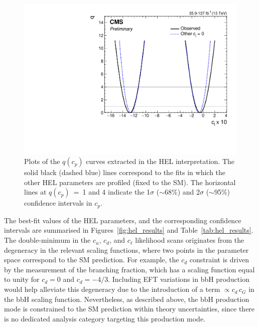 \begin{figure}[htbp]
  \includegraphics[width=.42\linewidth]{Figures/eft/cl_likelihood.pdf}
  \caption[Likelihood scans of the HEL parameters]
  {
    Plots of the $q(c_p)$ curves extracted in the HEL interpretation. The solid black (dashed blue) lines correspond to the fits in which the other HEL parameters are profiled (fixed to the SM). The horizontal lines at $q(c_p)$~=~1 and 4 indicate the 1$\sigma$ ($\sim$68\%) and 2$\sigma$ ($\sim$95\%) confidence intervals in $c_p$.
  }
  \label{fig:hel_likelihood_scans}
\end{figure}

The best-fit values of the HEL parameters, and the corresponding confidence intervals are summarised in Figures~\ref{fig:hel_results} and Table~\ref{tab:hel_results}. The double-minimum in the $c_u$, $c_d$, and $c_\ell$ likelihood scans originates from the degeneracy in the relevant scaling functions, where two points in the parameter space correspond to the SM prediction. For example, the $c_d$ constraint is driven by the measurement of the \Hbb branching fraction, which has a scaling function equal to unity for $c_d=0$ and $c_d=-4/3$. Including EFT variations in bbH production would help alleviate this degeneracy due to the introduction of a term $\propto c_d\,c_G$ in the bbH scaling function. Nevertheless, as described above, the bbH production mode is constrained to the SM prediction within theory uncertainties, since there is no dedicated analysis category targeting this production mode. 

